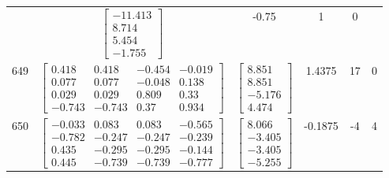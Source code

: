 \documentclass[a4paper,12pt]{article}
\begin{document}
\begin{tabular}{c c c c c c}
&
$\begin{bmatrix} -11.413 \\ 8.714 \\ 5.454 \\ -1.755 \end{bmatrix}$
&
-0.75
&
1
&
0
\\
649
&
$\begin{bmatrix} 0.418 & 0.418 & -0.454 & -0.019 \\ 0.077 & 0.077 & -0.048 & 0.138 \\ 0.029 & 0.029 & 0.809 & 0.33 \\ -0.743 & -0.743 & 0.37 & 0.934 \end{bmatrix}$
&
$\begin{bmatrix} 8.851 \\ 8.851 \\ -5.176 \\ 4.474 \end{bmatrix}$
&
1.4375
&
17
&
0
\\
650
&
$\begin{bmatrix} -0.033 & 0.083 & 0.083 & -0.565 \\ -0.782 & -0.247 & -0.247 & -0.239 \\ 0.435 & -0.295 & -0.295 & -0.144 \\ 0.445 & -0.739 & -0.739 & -0.777 \end{bmatrix}$
&
$\begin{bmatrix} 8.066 \\ -3.405 \\ -3.405 \\ -5.255 \end{bmatrix}$
&
-0.1875
&
-4
&
4
\\
\end{tabular} \egroup \newpage
\end{document}

